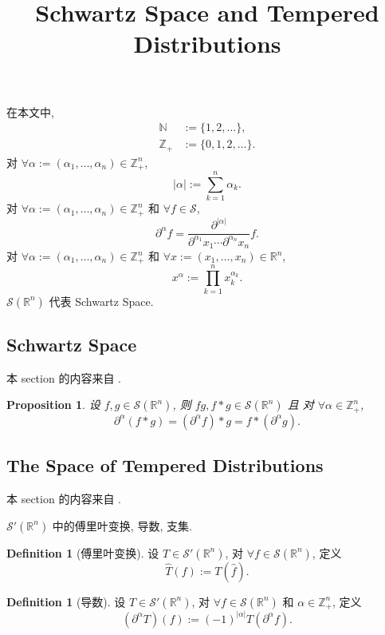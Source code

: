 \documentclass[a4paper,11pt]{article}
\title{Schwartz Space and Tempered Distributions}
\newtheorem{proposition}[theorem]{Proposition}
\theoremstyle{definition}
\newtheorem{definition}[theorem]{Definition}
\begin{document}
\maketitle

在本文中, 
\begin{align*}
    \mathbb{N} &:= \{1, 2, \ldots\}, \\
    \mathbb{Z}_+ &:= \{0, 1, 2, \ldots\}.
\end{align*}
对 $ \forall \alpha := (\alpha_1, \ldots, \alpha_n) \in \mathbb{Z}_+^n $,
$$
    |\alpha| := \sum_{k = 1}^n \alpha_k.
$$
对 $ \forall \alpha := (\alpha_1, \ldots, \alpha_n) \in \mathbb{Z}_+^n $ 
和 $ \forall f \in \mathcal{S} $,
$$
    \partial^\alpha f = \frac{\partial^{|\alpha|}}{\partial^{\alpha_1} x_1 \cdots \partial^{\alpha_n} x_n} f.
$$
对 $ \forall \alpha := (\alpha_1, \ldots, \alpha_n) \in \mathbb{Z}_+^n $ 
和 $ \forall x := (x_1, \ldots, x_n) \in \mathbb{R}^n $,
$$
    x^\alpha := \prod_{k = 1}^n x_k^{\alpha_k}.
$$ 
$ \mathcal{S}(\mathbb{R}^n) $ 代表 Schwartz Space.

\subsection{Schwartz Space}

本 section 的内容来自 \cite[2.2]{g14c}.

\begin{proposition}
    设 $ f, g \in \mathcal{S}(\mathbb{R}^n) $, 则 $ f g, f * g \in \mathcal{S}(\mathbb{R}^n) $ 且
    对 $ \forall \alpha \in \mathbb{Z}_+^n $,
    $$
        \partial^\alpha (f * g) =  (\partial^\alpha f) * g = f * (\partial^\alpha g).
    $$
\end{proposition}

\subsection{The Space of Tempered Distributions}

本 section 的内容来自 \cite[2.3]{g14c}.

$ \mathcal{S}'(\mathbb{R}^n) $ 中的傅里叶变换, 导数, 支集.

\begin{definition}[傅里叶变换]
    设 $ T \in \mathcal{S}'(\mathbb{R}^n) $, 对 $ \forall f \in \mathcal{S}(\mathbb{R}^n) $, 定义
    $$
        \widehat{T}(f) := T(\hat{f}).
    $$
\end{definition}

\begin{definition}[导数]
    设 $ T \in \mathcal{S}'(\mathbb{R}^n) $, 对 $ \forall f \in \mathcal{S}(\mathbb{R}^n) $ 和 $ \alpha \in \mathbb{Z}_+^n $, 定义
    $$
        (\partial^\alpha T) (f) := (-1)^{|\alpha|} T (\partial^\alpha f).
    $$
\end{definition}
\end{document}
